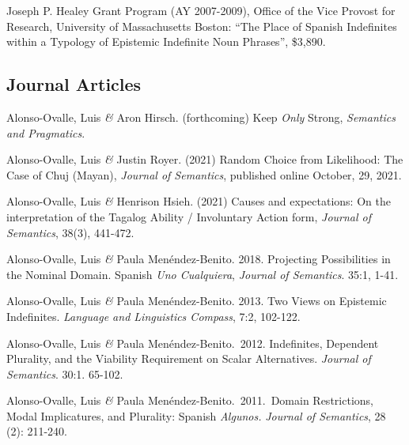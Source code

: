 \documentclass[11pt]{article}
\begin{document}
Joseph P. Healey Grant Program (AY 2007-2009), Office of the Vice Provost for Research, University of Massachusetts Boston: ``The Place of Spanish Indefinites within a Typology of Epistemic Indefinite Noun Phrases'', \$3,890.


\subsection*{Journal Articles}

Alonso-Ovalle, Luis \textit{\&} Aron Hirsch. (forthcoming) Keep \textit{Only} Strong,  \textit{Semantics and Pragmatics}.

Alonso-Ovalle, Luis \textit{\&} Justin Royer. (2021) Random Choice from Likelihood: The Case of Chuj (Mayan), \textit{Journal of Semantics}, published online October, 29, 2021. %

Alonso-Ovalle, Luis \textit{\&} Henrison Hsieh. (2021) Causes and expectations: On the interpretation of the Tagalog Ability / Involuntary Action form, \textit{Journal of Semantics}, 38(3), 441-472.%

Alonso-Ovalle, Luis \textit{\&} Paula Men\'endez-Benito. 2018. Projecting Possibilities in the Nominal Domain. Spanish \textit{Uno Cualquiera}, \textit{Journal of Semantics}. 35:1, 1-41. %


Alonso-Ovalle, Luis \textit{\&} Paula
    Men\'endez-Benito. 2013. Two Views on Epistemic
    Indefinites. \textit{Language and Linguistics Compass}, 7:2, 102-122. 

Alonso-Ovalle, Luis \textit{\&} Paula
    Men\'endez-Benito.\ 2012. Indefinites, Dependent Plurality, and
    the Viability Requirement on Scalar Alternatives. \textit{Journal
      of Semantics}. 30:1. 65-102. %

Alonso-Ovalle, Luis \textit{\&} Paula
    Men\'endez-Benito.\ 2011.\ Domain Restrictions, Modal
    Implicatures, and Plurality: Spanish \textit{Algunos.}
    \textit{Journal of Semantics}, 28 (2): 211-240.
\end{document}

